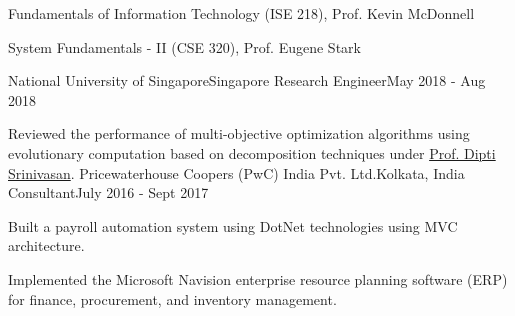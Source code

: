 \documentclass[letterpaper,10pt]{article}
\begin{document}
\resumeItemListStart
\item {Fundamentals of Information Technology (ISE 218), Prof. Kevin McDonnell}
\item {System Fundamentals - II (CSE 320), Prof. Eugene Stark}
\resumeItemListEnd

\resumeSubheading 
{National University of Singapore}{Singapore}
{Research Engineer}{May 2018 - Aug 2018}
\resumeItemListStart
\item {Reviewed the performance of multi-objective optimization algorithms using evolutionary computation based on decomposition techniques under \href{https://www.ece.nus.edu.sg/gems/profhome.html}{Prof. Dipti Srinivasan}.}
\resumeItemListEnd
\resumeSubheading
{Pricewaterhouse Coopers (PwC) India Pvt. Ltd.}{Kolkata, India}
{Consultant}{July 2016 - Sept 2017}
\resumeItemListStart
\item {Built a payroll automation system using DotNet technologies using MVC architecture.}
\item {Implemented the Microsoft Navision enterprise resource planning software (ERP) for finance, procurement, and inventory management.}
\resumeItemListEnd
\resumeSubHeadingListEnd

\end{document}
